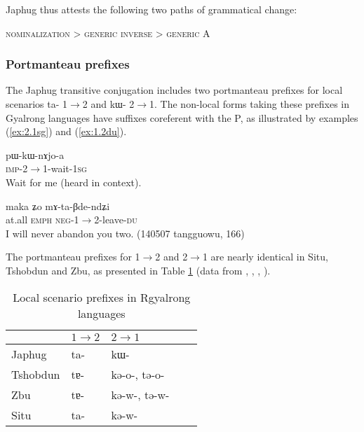\documentclass[oldfontcommands,oneside,a4paper,11pt]{article}
\newcommand{\ipa}[1]{\mbox{\phon #1}} %
\begin{document}
Japhug thus attests the following two paths of grammatical change:

\begin{exe}
\ex 
\glt \textsc{nominalization} > \textsc{generic} 
\ex 
\glt \textsc{inverse} > \textsc{generic A}
\end{exe}

\subsubsection{Portmanteau prefixes}
The Japhug transitive conjugation includes two portmanteau prefixes for local scenarios \ipa{ta-} 1$\rightarrow$2 and \ipa{kɯ-} 2$\rightarrow$1.  The non-local forms taking these prefixes in Gyalrong languages have suffixes coreferent with the P, as illustrated by examples (\ref{ex:2.1sg}) and (\ref{ex:1.2du}).

\begin{exe}
\ex \label{ex:2.1sg}
\gll \ipa{pɯ-kɯ-nɤjo-a} \\
\textsc{imp}-2$\rightarrow$1-wait-\textsc{1sg} \\
\glt Wait for me (heard in context).
\end{exe}

\begin{exe}
\ex \label{ex:1.2du}
\gll  \ipa{maka} 	\ipa{ʑo} 	\ipa{mɤ-ta-βde-ndʑi} \\
at.all \textsc{emph} \textsc{neg}-1$\rightarrow$2-leave-\textsc{du} \\
\glt I will never abandon you two. (140507 tangguowu, 166)
\end{exe}

The portmanteau prefixes for 1$\rightarrow$2 and 2$\rightarrow$1 are nearly identical in Situ, Tshobdun and Zbu, as presented in Table \ref{tab:local.rgy} (data from \citealt[218]{linxr93jiarong}, \citealt{jackson02rentongdengdi}, \citealt{jacques12agreement}, \citealt{gongxun14agreement}).

\begin{table}[H]
\caption{Local scenario prefixes in Rgyalrong languages} \centering \label{tab:local.rgy} 
\begin{tabular}{lllll}
\toprule
& $1\rightarrow2$ & $2\rightarrow1$ \\
\midrule
Japhug &  \ipa{ta-} & \ipa{kɯ-} \\
Tshobdun &  \ipa{tɐ-} & \ipa{kə-o-}, \ipa{tə-o-} \\
Zbu &  \ipa{tɐ-} &\ipa{kə-w-}, \ipa{tə-w-} \\
Situ &  \ipa{ta-} & \ipa{kə-w-} \\
\bottomrule
\end{tabular}
\end{table}
\end{document}
